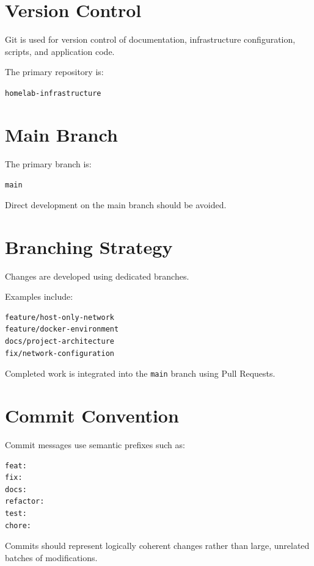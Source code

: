 \section{Version Control}

Git is used for version control of documentation, infrastructure
configuration, scripts, and application code.

The primary repository is:

\begin{center}
\texttt{homelab-infrastructure}
\end{center}

\section{Main Branch}

The primary branch is:

\begin{center}
\texttt{main}
\end{center}

Direct development on the main branch should be avoided.

\section{Branching Strategy}

Changes are developed using dedicated branches.

Examples include:

\begin{verbatim}
feature/host-only-network
feature/docker-environment
docs/project-architecture
fix/network-configuration
\end{verbatim}

Completed work is integrated into the \texttt{main} branch using Pull Requests.

\section{Commit Convention}

Commit messages use semantic prefixes such as:

\begin{verbatim}
feat:
fix:
docs:
refactor:
test:
chore:
\end{verbatim}

Commits should represent logically coherent changes rather than large,
unrelated batches of modifications.